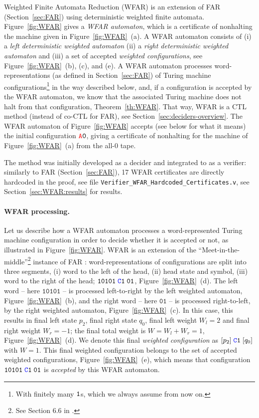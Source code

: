 Weighted Finite Automata Reduction (WFAR) is an extension of FAR (Section~\ref{sec:FAR}) using deterministic weighted finite automata. Figure~\ref{fig:WFAR} gives a \textit{WFAR automaton}, which is a certificate of nonhalting the machine given in Figure~\ref{fig:WFAR}~(a). A WFAR automaton consists of (i) a \textit{left deterministic weighted automaton} (ii) a \textit{right deterministic weighted automaton} and (iii) a set of accepted \textit{weighted configurations}, see Figure~\ref{fig:WFAR}~(b), (c), and (e).
A WFAR automaton processes word-representations (as defined in Section~\ref{sec:FAR}) of Turing machine configurations\footnote{With finitely many $\texttt{1}$s, which we always assume from now on.} in the way described below, and, if a configuration is accepted by the WFAR automaton, we know that the associated Turing machine does not halt from that configuration, Theorem~\ref{th:WFAR}. That way, WFAR is a CTL method (instead of co-CTL for FAR), see Section~\ref{sec:deciders-overview}. The WFAR automaton of Figure~\ref{fig:WFAR} accepts (see below for what it means) the initial configuration $\texttt{\stateA}\szero$, giving a certificate of nonhalting for the machine of Figure~\ref{fig:WFAR}~(a) from the all-0 tape.

The method was initially developed as a decider \cite{iijil1_2025_14914502} and integrated to \CoqBB as a verifier: similarly to FAR (Section~\ref{sec:FAR}), 17 WFAR certificates are directly hardcoded in the \Coq proof, see file \texttt{Verifier\_WFAR\_Hardcoded\_Certificates.v}, see Section~\ref{sec:WFAR:results} for results.

\paragraph{WFAR processing.} Let us describe how a WFAR automaton processes a word-represented Turing machine configuration in order to decide whether it is accepted or not, as illustrated in Figure~\ref{fig:WFAR}. WFAR is an extension of the ``Meet-in-the-middle''\footnote{See Section 6.6 in \cite{bbchallenge_part1}.} instance of FAR \cite{bbchallenge_part1}: word-representations of configurations are split into three segments, (i) word to the left of the head, (ii) head state and symbol, (iii) word to the right of the head; \eg $\texttt{10101}\; \texttt{\stateC}\sone\; \texttt{01}$, Figure~\ref{fig:WFAR}~(d). The left word -- here $\texttt{10101}$ -- is processed left-to-right by the left weighted automaton, Figure~\ref{fig:WFAR}~(b), and the right word -- here $\texttt{01}$ -- is processed right-to-left, by the right weighted automaton, Figure~\ref{fig:WFAR}~(c). In this case, this results in final left state $p_2$, final right state $q_0$, final left weight $W_l = 2$ and final right weight $W_r = -1$; the final total weight is $W = W_l + W_r = 1$, Figure~\ref{fig:WFAR}~(d). We denote this final \textit{weighted configuration} as $[p_2]\; \texttt{\stateC}\sone\; [q_0]$ with $W=1$. This final weighted configuration belongs to the set of accepted weighted configurations, Figure~\ref{fig:WFAR}~(e), which means that configuration $\texttt{10101}\; \texttt{\stateC}\sone\; \texttt{01}$ is \textit{accepted} by this WFAR automaton.


